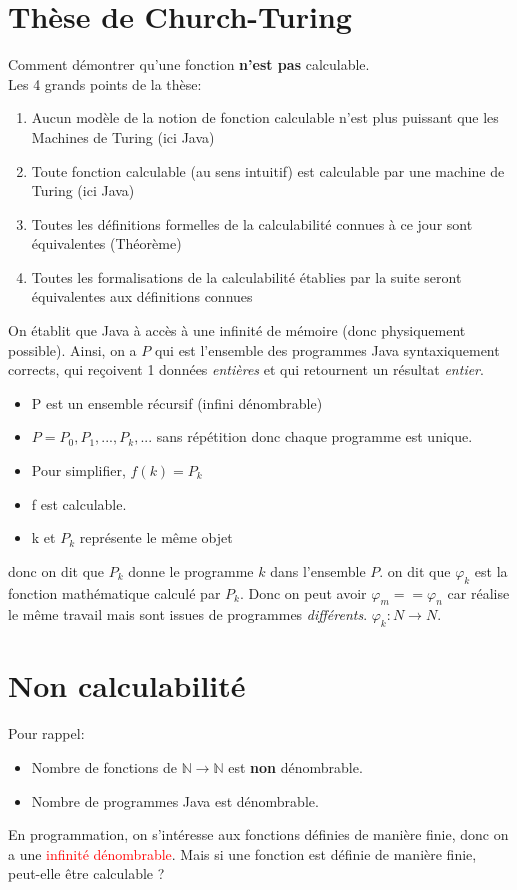 \documentclass{report}
\begin{document}
\section{Thèse de Church-Turing}
Comment démontrer qu'une fonction \textbf{n'est pas} calculable.\\
Les 4 grands points de la thèse:
\begin{enumerate}
\item Aucun modèle de la notion de fonction calculable n’est plus puissant que les Machines de Turing (ici Java)
\item Toute fonction calculable (au sens intuitif) est calculable par une machine de Turing (ici Java)
\item Toutes les définitions formelles de la calculabilité connues à ce jour sont équivalentes (Théorème)
\item Toutes les formalisations de la calculabilité établies par la suite seront
équivalentes aux définitions connues
\end{enumerate}
On établit que Java à accès à une infinité de mémoire (donc physiquement possible). Ainsi, on a $P$ qui est l'ensemble des programmes Java syntaxiquement corrects, qui reçoivent 1 données \textit{entières} et qui retournent un résultat \textit{entier}.
\begin{itemize}
\item P est un ensemble récursif (infini dénombrable)
\item $P = P_0, P_1, ..., P_k, ...$ sans répétition donc chaque programme est unique.
\item Pour simplifier, $f(k) = P_k$
\item f est calculable.
\item k et $P_k$ représente le même objet
\end{itemize}

donc on dit que $P_k$ donne le programme $k$ dans l'ensemble $P$. on dit que $\varphi_k$ est la fonction mathématique calculé par $P_k$. Donc on peut avoir $\varphi_m == \varphi_n$ car réalise le même travail mais sont issues de programmes \textit{différents}. $\varphi_k: N \rightarrow N$. 

\section{Non calculabilité}
Pour rappel:
\begin{itemize}
\item Nombre de fonctions de $\mathbb{N} \rightarrow \mathbb{N}$ est \textbf{non} dénombrable.
\item Nombre de programmes Java est dénombrable.
\end{itemize}
En programmation, on s'intéresse aux fonctions définies de manière finie, donc on a une \textcolor{red}{infinité dénombrable}. Mais si une fonction est définie de manière finie, peut-elle être calculable ?
\end{document}
